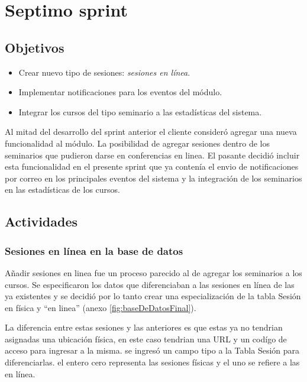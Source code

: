 \section{Septimo sprint} %
\label{sec:septimo_sprint}

\subsection{Objetivos}

\begin{itemize}
	\item Crear nuevo tipo de sesiones: \emph{sesiones en línea}.
	\item Implementar notificaciones para los eventos del módulo.
	\item Integrar los cursos del tipo seminario a las estadísticas del sistema.
\end{itemize}

Al mitad del desarrollo del sprint anterior el cliente consideró agregar una nueva funcionalidad al módulo. La posibilidad de agregar sesiones dentro de los seminarios que pudieron darse en conferencias en linea. El pasante decidió incluir esta funcionalidad en el presente sprint que ya contenía el envio de notificaciones por correo en los principales eventos del sistema y la integración de los seminarios en las estadísticas de los cursos.

\subsection{Actividades} %
\label{sub:actividades7}

\subsubsection{Sesiones en línea en la base de datos}

Añadir sesiones en linea fue un proceso parecido al de agregar los seminarios a los cursos. Se especificaron los datos que diferenciaban a las sesiones en línea de las ya existentes y se decidió por lo tanto crear una especialización de la tabla Sesión en física y ``en linea'' (anexo \ref{fig:baseDeDatosFinal}).

La diferencia entre estas sesiones y las anteriores es que estas ya no tendrian asignadas una ubicación física, en este caso tendrian una URL y un codígo de acceso para ingresar a la misma. se ingresó un campo tipo a la Tabla Sesión para diferenciarlas. el entero cero representa las sesiones físicas y el uno se refiere a las en línea.

